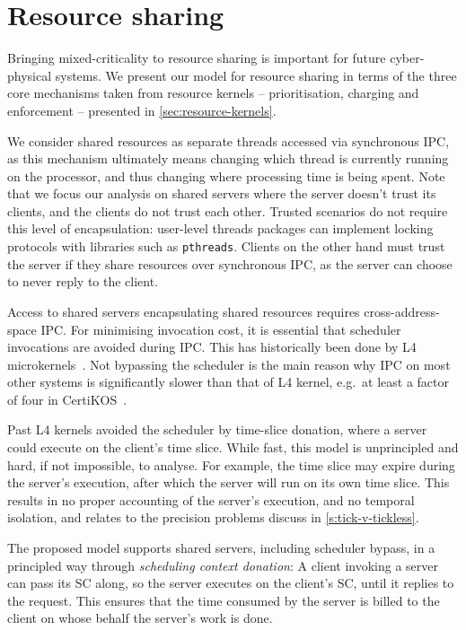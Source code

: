 \section{Resource sharing}\label{s:locking}

Bringing mixed-criticality to resource sharing is important for future cyber-physical systems. We 
present our model for resource sharing in terms of the three core mechanisms taken from resource
kernels -- prioritisation, charging and enforcement -- presented in \cref{sec:resource-kernels}.

We consider shared resources as separate threads accessed via synchronous \gls{IPC}, as this
mechanism ultimately means changing which thread is currently running on the processor, and thus
changing where processing time is being spent. Note that we focus our analysis on shared servers
where the server doesn't trust its clients, and the clients do not trust each other. Trusted
scenarios do not require this level of encapsulation: user-level threads packages can implement
locking protocols with libraries such as \texttt{pthreads}. Clients on the other hand must trust the
server if they share resources over synchronous \gls{IPC}, as the server can choose to never reply
to the client.

Access to shared servers encapsulating shared resources requires
cross-address-space IPC. For minimising invocation cost, it is
essential that scheduler invocations are avoided during IPC. This has
historically been done by L4
microkernels~\citep{Heiser_Elphinstone_16}. Not bypassing the
scheduler is the main reason why IPC on most other systems is
significantly slower than that of L4 kernel, e.g.\ at least a factor
of four in CertiKOS~\citep{Gu_SCWKSC_16}.

Past L4 kernels avoided the scheduler by time-slice donation, where a
server could execute on the client's time slice. While fast, this
model is unprincipled and hard, if not impossible, to
analyse. For example, the time slice may expire during the server's
execution, after which the server will run on its own time slice.
This results in no proper accounting of the server's execution, and no temporal isolation, and
relates to the precision problems discuss in \cref{s:tick-v-tickless}.

The proposed model supports shared servers, including scheduler
bypass, in a principled way through \emph{scheduling context
donation}: A client invoking a server can pass its SC along, so the
server executes on the client's SC, until it replies to the
request. This ensures that the time consumed by the server is billed
to the client on whose behalf the server's work is done.


